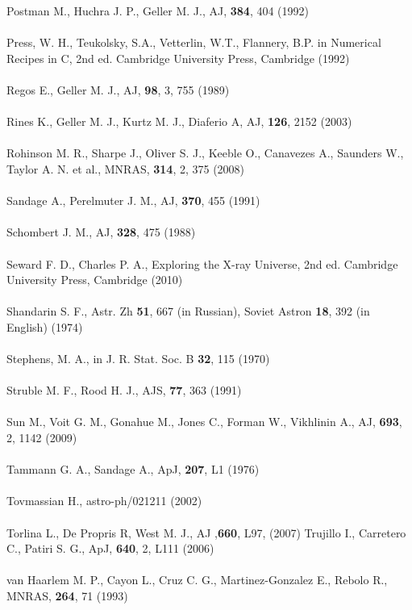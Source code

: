Postman M., Huchra J. P., Geller M. J., AJ, \textbf{ 384}, 404 (1992)\\\\
Press, W. H., Teukolsky, S.A., Vetterlin, W.T., Flannery, B.P. in Numerical Recipes in C, 2nd ed. Cambridge University Press, Cambridge (1992)\\\\
Regos E., Geller M. J., AJ, \textbf{98}, 3, 755 (1989)\\\\
Rines K., Geller M. J., Kurtz M. J., Diaferio A, AJ, \textbf{126}, 2152 (2003)\\\\
Rohinson M. R., Sharpe J., Oliver S. J., Keeble O., Canavezes A., Saunders W., Taylor A. N. et al., MNRAS, \textbf{ 314},  2, 375 (2008)\\\\
Sandage A., Perelmuter J. M., AJ, \textbf{ 370}, 455 (1991)\\\\
Schombert J. M., AJ, \textbf{ 328}, 475 (1988) \\\\
Seward F. D., Charles P. A., Exploring the X-ray Universe, 2nd ed. Cambridge University Press, Cambridge (2010)\\\\
Shandarin S. F., Astr. Zh \textbf{51}, 667 (in Russian), Soviet Astron \textbf{18}, 392 (in English) (1974)\\\\
Stephens, M. A., in J. R. Stat. Soc. B \textbf{32}, 115 (1970)\\\\
Struble M. F., Rood H. J., AJS,\textbf{ 77}, 363 (1991)\\\\
Sun M., Voit G. M., Gonahue M., Jones C., Forman W., Vikhlinin A., AJ, \textbf{ 693},  2, 1142 (2009)\\\\
Tammann G. A., Sandage A., ApJ, \textbf{207}, L1 (1976)\\\\
Tovmassian H., astro-ph/021211 (2002)\\\\
Torlina L., De Propris R, West M. J., AJ ,\textbf{660}, L97, (2007)
Trujillo I., Carretero C., Patiri S. G., ApJ, \textbf{640}, 2, L111 (2006)\\\\
van Haarlem M. P., Cayon L., Cruz C. G., Martinez-Gonzalez E., Rebolo R., MNRAS, \textbf{264}, 71 (1993)\\\\
